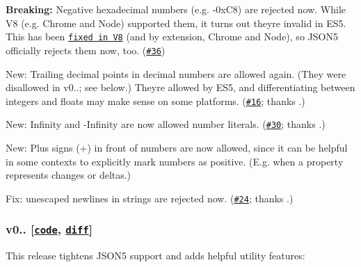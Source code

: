 \begin{DoxyItemize}
\item {\bfseries Breaking\+:} Negative hexadecimal numbers (e.\+g. {\ttfamily -\/0x\+C8}) are rejected now. While V8 (e.\+g. Chrome and Node) supported them, it turns out they\textquotesingle{}re invalid in E\+S5. This has been \href{http://code.google.com/p/v8/issues/detail?id=2240}{\tt fixed in V8} (and by extension, Chrome and Node), so J\+S\+O\+N5 officially rejects them now, too. (\href{https://github.com/aseemk/json5/issues/36}{\tt \#36})
\item New\+: Trailing decimal points in decimal numbers are allowed again. (They were disallowed in v0..; see below.) They\textquotesingle{}re allowed by E\+S5, and differentiating between integers and floats may make sense on some platforms. (\href{https://github.com/aseemk/json5/issues/16}{\tt \#16}; thanks \href{https://github.com/Midar}{\tt }.)
\item New\+: {\ttfamily Infinity} and {\ttfamily -\/\+Infinity} are now allowed number literals. (\href{https://github.com/aseemk/json5/issues/30}{\tt \#30}; thanks \href{https://github.com/pepkin88}{\tt }.)
\item New\+: Plus signs ({\ttfamily +}) in front of numbers are now allowed, since it can be helpful in some contexts to explicitly mark numbers as positive. (E.\+g. when a property represents changes or deltas.)
\item Fix\+: unescaped newlines in strings are rejected now. (\href{https://github.com/aseemk/json5/issues/24}{\tt \#24}; thanks \href{https://github.com/Midar}{\tt }.)
\end{DoxyItemize}

\subsubsection*{v0.. \mbox{[}\href{https://github.com/aseemk/json5/tree/v0.1.0}{\tt code}, \href{https://github.com/aseemk/json5/compare/v0.0.1...v0.1.0}{\tt diff}\mbox{]}}

This release tightens J\+S\+O\+N5 support and adds helpful utility features\+:


